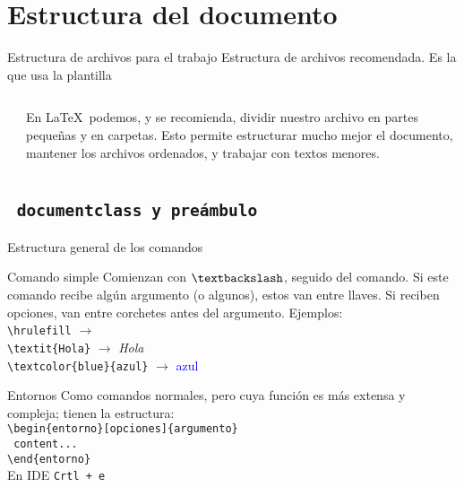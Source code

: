 \documentclass[12pt]{beamer}
\begin{document}
\section{Estructura del documento}

\begin{frame}{Estructura de archivos para el trabajo}
	Estructura de archivos recomendada. Es la que usa la plantilla
	\begin{columns}
		\begin{column}{0.4\textwidth}
		\end{column}
		\begin{column}{0.6\textwidth}
			En \LaTeX\ podemos, y se recomienda, dividir nuestro archivo en partes pequeñas y en carpetas. Esto permite estructurar mucho mejor el documento, mantener los archivos ordenados, y trabajar con textos menores.
		\end{column}
	\end{columns}
\end{frame}

\subsection{\texttt{\ documentclass y preámbulo}}

\begin{frame}{Estructura general de los comandos}
	\begin{block}{Comando simple}
		Comienzan con $\textbackslash$, seguido del comando. Si este comando recibe algún argumento (o algunos), estos van entre llaves. Si reciben opciones, van entre corchetes antes del argumento. Ejemplos: \\
		\verb|\hrulefill| $\rightarrow$ \hrulefill \\
		\verb|\textit{Hola}| $\rightarrow$ \textit{Hola} \\
		\verb|\textcolor{blue}{azul}| $\rightarrow$ \textcolor{blue}{azul}
	\end{block} \pause
	\begin{block}{Entornos}
		Como comandos normales, pero cuya función es más extensa y compleja; tienen la estructura: \\
		
		\verb|\begin{entorno}[opciones]{argumento}| \\ \verb| content... | \\ 
		\verb|\end{entorno}| \\
		 En IDE \texttt{Crtl + e}
	\end{block}
\end{frame}
\end{document}
